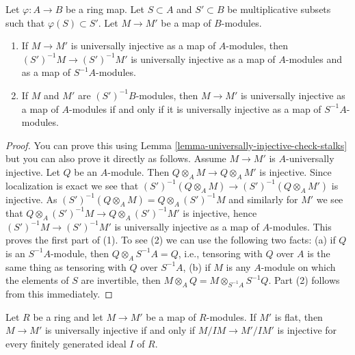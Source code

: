 \begin{lemma}
\label{lemma-universally-injective-localize}
Let $\varphi : A \to B$ be a ring map. Let $S \subset A$ and
$S' \subset B$ be multiplicative subsets such that $\varphi(S) \subset S'$.
Let $M \to M'$ be a map of $B$-modules.
\begin{enumerate}
\item If $M \to M'$ is universally injective as a map of $A$-modules,
then $(S')^{-1}M \to (S')^{-1}M'$ is universally injective as a map of
$A$-modules and as a map of $S^{-1}A$-modules.
\item If $M$ and $M'$ are $(S')^{-1}B$-modules, then $M \to M'$
is universally injective as a map of $A$-modules if and only if
it is universally injective as a map of $S^{-1}A$-modules.
\end{enumerate}
\end{lemma}

\begin{proof}
You can prove this using
Lemma \ref{lemma-universally-injective-check-stalks}
but you can also prove it directly as follows.
Assume $M \to M'$ is $A$-universally injective.
Let $Q$ be an $A$-module. Then $Q \otimes_A M \to Q \otimes_A M'$
is injective. Since localization is exact we see that
$(S')^{-1}(Q \otimes_A M) \to (S')^{-1}(Q \otimes_A M')$ is injective.
As $(S')^{-1}(Q \otimes_A M) = Q \otimes_A (S')^{-1}M$ and similarly for $M'$
we see that
$Q \otimes_A (S')^{-1}M \to Q \otimes_A (S')^{-1}M'$ is injective, hence
$(S')^{-1}M \to (S')^{-1}M'$ is universally injective as a map of
$A$-modules. This proves the first part of (1).
To see (2) we can use the following two facts: (a) if $Q$ is an
$S^{-1}A$-module, then $Q \otimes_A S^{-1}A = Q$, i.e., tensoring
with $Q$ over $A$ is the same thing as tensoring with $Q$ over $S^{-1}A$,
(b) if $M$ is any $A$-module on which the elements of $S$ are invertible,
then $M \otimes_A Q = M \otimes_{S^{-1}A} S^{-1}Q$.
Part (2) follows from this immediately.
\end{proof}

\begin{lemma}
\label{lemma-check-universally-injective-into-flat}
Let $R$ be a ring and let $M \to M'$ be a map of $R$-modules.
If $M'$ is flat, then $M \to M'$ is universally injective if
and only if $M/IM \to M'/IM'$ is injective for every finitely
generated ideal $I$ of $R$.
\end{lemma}

